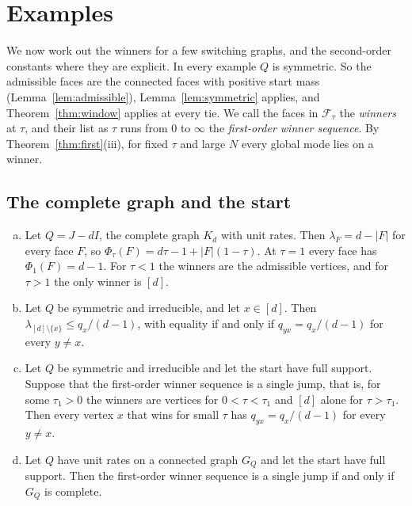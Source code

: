 \section{Examples}\label{sec:examples}

We now work out the winners for a few switching graphs, and the second-order
constants where they are explicit. In every example $Q$ is symmetric. So the
admissible faces are the connected faces with positive start mass
(Lemma~\ref{lem:admissible}), Lemma~\ref{lem:symmetric} applies, and
Theorem~\ref{thm:window} applies at every tie. We call the faces in
$\mathcal F_\tau$ the \emph{winners} at $\tau$, and their list as $\tau$ runs
from $0$ to $\infty$ the \emph{first-order winner sequence}. By
Theorem~\ref{thm:first}(iii), for fixed $\tau$ and large $N$ every global mode
lies on a winner.

\subsection{The complete graph and the start}\label{sec:ex-complete}

\begin{proposition}\label{prop:complete}
\begin{enumerate}[(a)]
\item Let $Q=J-dI$, the complete graph $K_d$ with unit rates. Then
$\lambda_F=d-\lvert F\rvert$ for every face $F$, so
$\Phi_\tau(F)=d\tau-1+\lvert F\rvert(1-\tau)$. At $\tau=1$ every face has
$\Phi_1(F)=d-1$. For $\tau<1$ the winners are the admissible vertices, and for
$\tau>1$ the only winner is $[d]$.
\item Let $Q$ be symmetric and irreducible, and let $x\in[d]$. Then
$\lambda_{[d]\setminus\{x\}}\le q_x/(d-1)$, with equality if and only if
$q_{yx}=q_x/(d-1)$ for every $y\ne x$.
\item Let $Q$ be symmetric and irreducible and let the start have full support.
Suppose that the first-order winner sequence is a single jump, that is, for some
$\tau_1>0$ the winners are vertices for $0<\tau<\tau_1$ and $[d]$ alone for
$\tau>\tau_1$. Then every vertex $x$ that wins for small $\tau$ has
$q_{yx}=q_x/(d-1)$ for every $y\ne x$.
\item Let $Q$ have unit rates on a connected graph $G_Q$ and let the start have
full support. Then the first-order winner sequence is a single jump if and only
if $G_Q$ is complete.
\end{enumerate}
\end{proposition}

